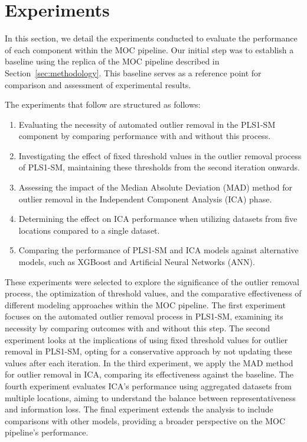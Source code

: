 \section{Experiments}\label{sec:experiments}
In this section, we detail the experiments conducted to evaluate the performance of each component within the MOC pipeline.
Our initial step was to establish a baseline using the replica of the MOC pipeline described in Section~\ref{sec:methodology}.
This baseline serves as a reference point for comparison and assessment of experimental results.

The experiments that follow are structured as follows:

\begin{enumerate}
    \item Evaluating the necessity of automated outlier removal in the PLS1-SM component by comparing performance with and without this process.
    \item Investigating the effect of fixed threshold values in the outlier removal process of PLS1-SM, maintaining these thresholds from the second iteration onwards.
    \item Assessing the impact of the Median Absolute Deviation (MAD) method for outlier removal in the Independent Component Analysis (ICA) phase.
    \item Determining the effect on ICA performance when utilizing datasets from five locations compared to a single dataset.
    \item Comparing the performance of PLS1-SM and ICA models against alternative models, such as XGBoost and Artificial Neural Networks (ANN).
\end{enumerate}

These experiments were selected to explore the significance of the outlier removal process, the optimization of threshold values, and the comparative effectiveness of different modeling approaches within the MOC pipeline.
The first experiment focuses on the automated outlier removal process in PLS1-SM, examining its necessity by comparing outcomes with and without this step.
The second experiment looks at the implications of using fixed threshold values for outlier removal in PLS1-SM, opting for a conservative approach by not updating these values after each iteration.
In the third experiment, we apply the MAD method for outlier removal in ICA, comparing its effectiveness against the baseline.
The fourth experiment evaluates ICA's performance using aggregated datasets from multiple locations, aiming to understand the balance between representativeness and information loss.
The final experiment extends the analysis to include comparisons with other models, providing a broader perspective on the MOC pipeline's performance.

